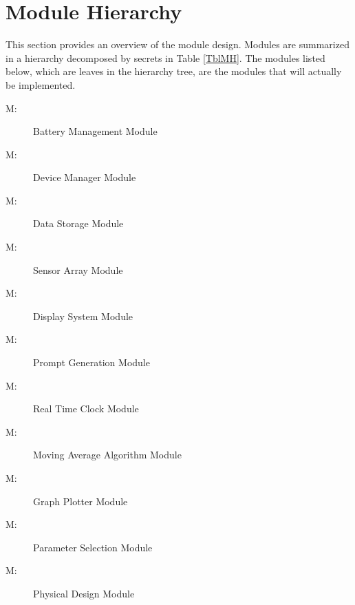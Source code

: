 \documentclass[12pt, titlepage]{article}
\newcounter{mnum}
\newcommand{\mthemnum}{M\themnum}
\begin{document}
\section{Module Hierarchy} \label{SecMH}

This section provides an overview of the module design. Modules are summarized
in a hierarchy decomposed by secrets in Table \ref{TblMH}. The modules listed
below, which are leaves in the hierarchy tree, are the modules that will
actually be implemented.

\begin{description}
  \item [ \mthemnum \label{mBM}:] Battery Management Module
  \item [ \mthemnum \label{mDM}:] Device Manager Module
  \item [ \mthemnum \label{mDS_1}:] Data Storage Module
  \item [ \mthemnum \label{mSA}:] Sensor Array Module
  \item [ \mthemnum \label{mDS_2}:] Display System Module
  \item [ \mthemnum \label{mPG}:] Prompt Generation Module
  \item [ \mthemnum \label{mRTC}:] Real Time Clock  Module
  \item [ \mthemnum \label{mMAA}:] Moving Average Algorithm Module
  \item [ \mthemnum \label{mGP}:] Graph Plotter  Module
  \item [ \mthemnum \label{mPS}:] Parameter Selection Module
  \item [ \mthemnum \label{mPD}:] Physical Design Module
\end{description}
\end{document}
